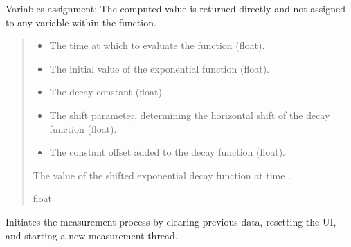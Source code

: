 \documentclass[letterpaper,10pt,english]{sphinxmanual}
\begin{document}
\begin{fulllineitems}
\begin{fulllineitems}
\sphinxAtStartPar
Variables assignment:
\sphinxhyphen{} The computed value is returned directly and not assigned to any variable within the function.
\begin{quote}\begin{description}
\begin{itemize}
\item {} 
\sphinxAtStartPar
{} \textendash{} The time at which to evaluate the function (float).

\item {} 
\sphinxAtStartPar
{} \textendash{} The initial value of the exponential function (float).

\item {} 
\sphinxAtStartPar
{} \textendash{} The decay constant (float).

\item {} 
\sphinxAtStartPar
{} \textendash{} The shift parameter, determining the horizontal shift of the decay function (float).

\item {} 
\sphinxAtStartPar
{} \textendash{} The constant offset added to the decay function (float).

\end{itemize}

\sphinxAtStartPar
The value of the shifted exponential decay function at time .

\sphinxAtStartPar
float

\end{description}\end{quote}

\end{fulllineitems}


\begin{fulllineitems}
\label{\detokenize{FLIMGraphics:FLIMGraphics.FLIMGraphic.startMeasurement}}
\pysigstartsignatures
{}
\pysigstopsignatures
\sphinxAtStartPar
Initiates the measurement process by clearing previous data, resetting the UI, and starting a new measurement thread.


\end{fulllineitems}
\end{fulllineitems}
\end{document}
